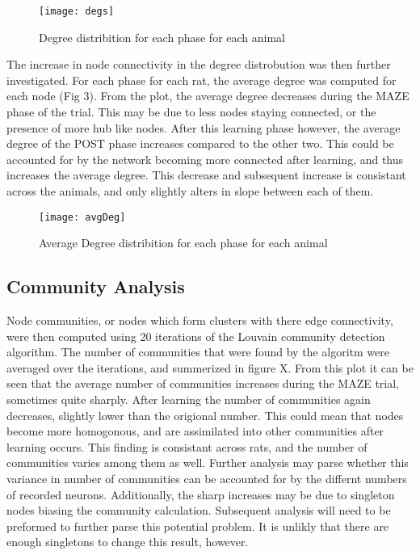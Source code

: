 \documentclass[9pt,twocolumn,twoside,lineno]{pnas-new}
\begin{document}
\begin{figure}[tbhp]
\centering
\texttt{[image: degs]}
\caption{Degree distribition for each phase for each animal}
\label{fig:degs}
\end{figure}

The increase in node connectivity in the degree distrobution was then further investigated. For each phase for each rat, the average degree was computed for each node (Fig 3). From the plot, the average degree decreases during the MAZE phase of the trial. This may be due to less nodes staying connected, or the presence of more hub like nodes. After this learning phase however, the average degree of the POST phase increases compared to the other two. This could be accounted for by the network becoming more connected after learning, and thus increases the average degree. This decrease and subsequent increase is consistant across the animals, and only slightly alters in slope between each of them. 

\begin{figure}[tbhp]
\centering
\texttt{[image: avgDeg]}
\caption{Average Degree distribition for each phase for each animal}
\label{fig:avgDeg}
\end{figure}



\subsection*{Community Analysis}

Node communities, or nodes which form clusters with there edge connectivity, were then computed using 20 iterations of the Louvain community detection algorithm. The number of communities that were found by the algoritm were averaged over the iterations, and summerized in figure X. From this plot it can be seen that the average number of communities increases during the MAZE trial, sometimes quite sharply. After learning the number of communities again decreases, slightly lower than the origional number. This could mean that nodes become more homogonous, and are assimilated into other communities after learning occurs. This finding is consistant across rats, and the number of communities varies among them as well. Further analysis may parse whether this variance in number of communities can be accounted for by the differnt numbers of recorded neurons. Additionally, the sharp increases may be due to singleton nodes biasing the community calculation. Subsequent analysis will need to be preformed to further parse this potential problem. It is unlikly that there are enough singletons to change this result, however. 
\end{document}
